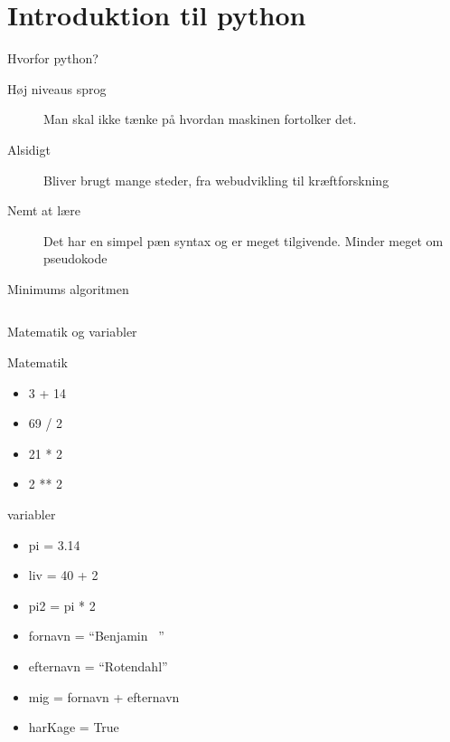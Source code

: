 \documentclass[12pt,t]{beamer}
\begin{document}
 \section{Introduktion til python}
     \frame{\tableofcontents[currentsection]}
     \begin{frame}[t]{Hvorfor python?}
         \begin{description}
             \item[Høj niveaus sprog] Man skal ikke tænke på hvordan
             maskinen fortolker det.
             \pause
             \item[Alsidigt] Bliver brugt mange steder,
             fra webudvikling til kræftforskning
             \pause
             \item[Nemt at lære] Det har en simpel pæn syntax og er meget
             tilgivende. Minder meget om pseudokode
         \end{description}
         \pause
         \begin{block}{Minimums algoritmen}
               \inputminted{python}{min.py}
        \end{block}
     \end{frame}

     \begin{frame}{Matematik og variabler}
         \vspace{-1em}
         \begin{block}{Matematik}
            \begin{itemize}
                \item 3 + 14 \pause
                \item 69 / 2 \pause
                \item 21 * 2 \pause
                \item 2 ** 2
            \end{itemize}
         \end{block}
         \pause
         \begin{block}{variabler}
             \begin{itemize}
                 \item pi  = 3.14
                \pause \item liv = 40 + 2
                \pause \item pi2 = pi * 2
                \pause \item fornavn = ``Benjamin ~''
                \pause \item efternavn = ``Rotendahl''
                \pause \item mig = fornavn + efternavn
                \pause \item harKage = True
             \end{itemize}
         \end{block}
     \end{frame}
\end{document}
